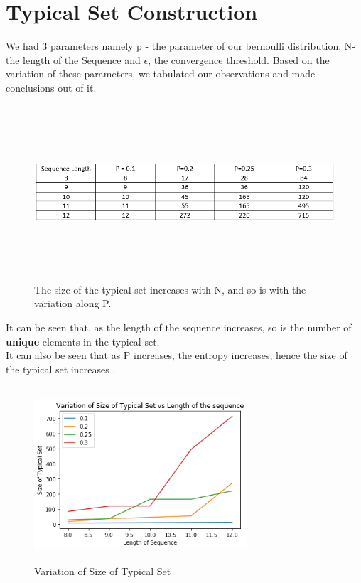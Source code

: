 \documentclass[11pt]{article}
\begin{document}
\section{Typical Set Construction}
We had 3 parameters namely p - the parameter of our bernoulli distribution, N- the length of the Sequence and \(\epsilon\), the convergence threshold. Based on the variation of these parameters, we tabulated our observations and made conclusions out of it. 

\begin{center}
        \begin{figure}[h]
        \centering
          \includegraphics[width=150mm, height=65mm]{Capture.PNG}
          \caption{ The size of the typical set increases with N, and so is with the variation along P. 
          }
          \label{fig:Piston}
        \end{figure}
\end{center}

It can be seen that, as the length of the sequence increases, so is the number of \textbf{unique} elements in the typical set. \\
It can also be seen that as P increases, the entropy increases, hence the size of the typical set increases . 


\begin{center}
        \begin{figure}[h]
        \centering
          \includegraphics[width=300, height=65mm]{a.png}
          \caption{ Variation of Size of Typical Set
          }
          \label{fig:Piston}
        \end{figure}
\end{center}
\end{document}

